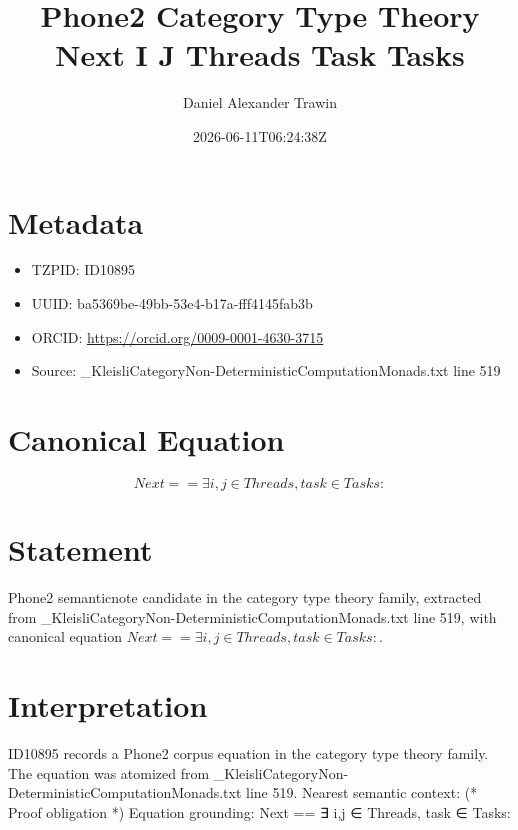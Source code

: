 \documentclass[11pt]{article}
\title{Phone2 Category Type Theory Next I J Threads Task Tasks}
\author{Daniel Alexander Trawin}
\date{2026-06-11T06:24:38Z}
\begin{document}
\maketitle
\section*{Metadata}
\begin{itemize}
\item TZPID: ID10895
\item UUID: ba5369be-49bb-53e4-b17a-fff4145fab3b
\item ORCID: \url{https://orcid.org/0009-0001-4630-3715}
\item Source: _KleisliCategoryNon-DeterministicComputationMonads.txt line 519
\end{itemize}
\section*{Canonical Equation}
\[
Next == ∃ i,j ∈ Threads, task ∈ Tasks:
\]
\section*{Statement}
Phone2 semanticnote candidate in the category type theory family, extracted from _KleisliCategoryNon-DeterministicComputationMonads.txt line 519, with canonical equation $Next == ∃ i,j ∈ Threads, task ∈ Tasks:$.
\section*{Interpretation}
ID10895 records a Phone2 corpus equation in the category type theory family. The equation was atomized from _KleisliCategoryNon-DeterministicComputationMonads.txt line 519. Nearest semantic context: (* Proof obligation *) Equation grounding: Next == ∃ i,j ∈ Threads, task ∈ Tasks:
\end{document}
